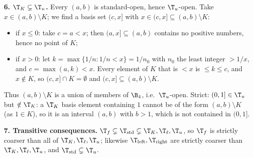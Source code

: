 \textbf{6. $\T_K\subsetneq\T_u$.} Every $(a,b)$ is standard-open, hence $\T_u$-open. Take
$x\in(a,b)\setminus K$; we find a basis set $(c,x]$ with $x\in(c,x]\subseteq(a,b)\setminus K$:
\begin{itemize}[nosep]
  \item if $x\le0$: take $c=a<x$; then $(a,x]\subseteq(a,b)$ contains no positive numbers,
        hence no point of $K$;
  \item if $x>0$: let $k=\max\{1/n:1/n<x\}=1/n_0$ with $n_0$ the least integer $>1/x$, and
        $c=\max(a,k)<x$. Every element of $K$ that is $<x$ is $\le k\le c$, and $x\notin K$, so
        $(c,x]\cap K=\emptyset$ and $(c,x]\subseteq(a,b)\setminus K$.
\end{itemize}
Thus $(a,b)\setminus K$ is a union of members of $\B_4$, i.e.\ $\T_u$-open. Strict:
$(0,1]\in\T_u$ but $\notin\T_K$: a $\T_K$ basis element containing $1$ cannot be of the form
$(a,b)\setminus K$ (as $1\in K$), so it is an interval $(a,b)$ with $b>1$, which is not
contained in $(0,1]$.

\textbf{7. Transitive consequences.}
$\T_f\subsetneq\T_{\mathrm{std}}\subsetneq\T_K,\T_\ell,\T_u$, so $\T_f$ is strictly coarser than
all of $\T_K,\T_\ell,\T_u$; likewise $\T_{\mathrm{left}},\T_{\mathrm{right}}$ are strictly
coarser than $\T_K,\T_\ell,\T_u$, and $\T_{\mathrm{std}}\subsetneq\T_u$.

